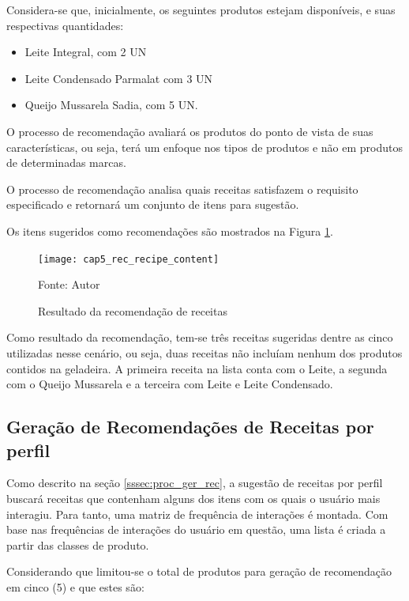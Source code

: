 Considera-se que, inicialmente, os seguintes produtos estejam disponíveis, e suas respectivas quantidades:

\begin{itemize} \parskip -3pt
    \item Leite Integral, com 2 UN
    \item Leite Condensado Parmalat com 3 UN 
    \item Queijo Mussarela Sadia, com 5 UN.
\end{itemize}

O processo de recomendação avaliará os produtos do ponto de vista de suas características, ou seja, terá um enfoque nos tipos de produtos e não em produtos de determinadas marcas.

O processo de recomendação analisa quais receitas satisfazem o requisito especificado e retornará um conjunto de itens para sugestão.

Os itens sugeridos como recomendações são mostrados na Figura \ref{fig:cap5_rec_recipe_content}.

\begin{figure}[htb]
\caption{Resultado da recomendação de receitas}
\label{fig:cap5_rec_recipe_content}
\texttt{[image: cap5\_rec\_recipe\_content]}

\footnotesize{Fonte: Autor}
\end{figure}

Como resultado da recomendação, tem-se três receitas sugeridas dentre as cinco utilizadas nesse cenário, ou seja, duas receitas não incluíam nenhum dos produtos contidos na geladeira. A primeira receita na lista conta com o Leite, a segunda com o Queijo Mussarela e a terceira com Leite e Leite Condensado.

\subsection{Geração de Recomendações de Receitas por perfil}

Como descrito na seção \ref{sssec:proc_ger_rec}, a sugestão de receitas por perfil buscará receitas que contenham alguns dos itens com os quais o usuário mais interagiu. Para tanto, uma matriz de frequência de interações é montada.  Com base nas frequências de interações do usuário em questão, uma lista é criada a partir das classes de produto.

Considerando que limitou-se o total de produtos para geração de recomendação em cinco (5) e que estes são:

